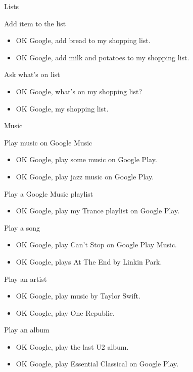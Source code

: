 \documentclass[
  a4paper,
]{article}
\providecommand{\tightlist}{%
  \setlength{\itemsep}{0pt}\setlength{\parskip}{0pt}}\usepackage{longtable,booktabs,array}
\begin{document}
Lists

Add item to the list

\begin{itemize}
\item
  OK Google, add bread to my shopping list.
\item
  OK Google, add milk and potatoes to my shopping list.
\end{itemize}

Ask what's on list

\begin{itemize}
\item
  OK Google, what's on my shopping list?
\item
  OK Google, my shopping list.
\end{itemize}

Music

Play music on Google Music

\begin{itemize}
\item
  OK Google, play some music on Google Play.
\item
  OK Google, play jazz music on Google Play.
\end{itemize}

Play a Google Music playlist

\begin{itemize}
\tightlist
\item
  OK Google, play my Trance playlist on Google Play.
\end{itemize}

Play a song

\begin{itemize}
\item
  OK Google, play Can't Stop on Google Play Music.
\item
  OK Google, plays At The End by Linkin Park.
\end{itemize}

Play an artist

\begin{itemize}
\item
  OK Google, play music by Taylor Swift.
\item
  OK Google, play One Republic.
\end{itemize}

Play an album

\begin{itemize}
\item
  OK Google, play the last U2 album.
\item
  OK Google, play Essential Classical on Google Play.
\end{itemize}
\end{document}
